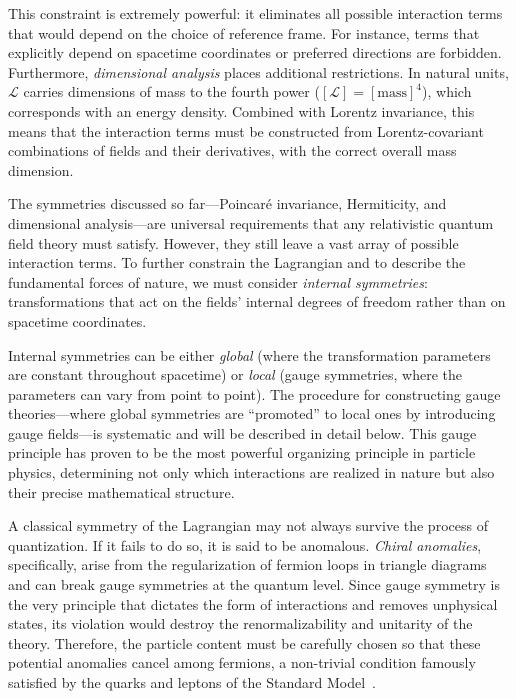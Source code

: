 This constraint is extremely powerful: it eliminates all possible interaction terms that would depend on the choice of reference frame. For instance, terms that explicitly depend on spacetime coordinates or preferred directions are forbidden. Furthermore, \textit{dimensional analysis} places additional restrictions. In natural units, $\mathcal{L}$ carries dimensions of mass to the fourth power ($[\mathcal{L}] = [\text{mass}]^4$), which corresponds with an energy density. Combined with Lorentz invariance, this means that the interaction terms must be constructed from Lorentz-covariant combinations of fields and their derivatives, with the correct overall mass dimension.

The symmetries discussed so far—Poincaré invariance, Hermiticity, and dimensional analysis—are universal requirements that any relativistic quantum field theory must satisfy. However, they still leave a vast array of possible interaction terms. To further constrain the Lagrangian and to describe the fundamental forces of nature, we must consider \textit{internal symmetries}: transformations that act on the fields' internal degrees of freedom rather than on spacetime coordinates.

Internal symmetries can be either \textit{global} (where the transformation parameters are constant throughout spacetime) or \textit{local} (gauge symmetries, where the parameters can vary from point to point). The procedure for constructing gauge theories—where global symmetries are ``promoted'' to local ones by introducing gauge fields—is systematic and will be described in detail below. This gauge principle has proven to be the most powerful organizing principle in particle physics, determining not only which interactions are realized in nature but also their precise mathematical structure.

A classical symmetry of the Lagrangian may not always survive the process of quantization. If it fails to do so, it is said to be anomalous. \textit{Chiral anomalies}, specifically, arise from the regularization of fermion loops in triangle diagrams and can break gauge symmetries at the quantum level. Since gauge symmetry is the very principle that dictates the form of interactions and removes unphysical states, its violation would destroy the renormalizability and unitarity of the theory. Therefore, the particle content must be carefully chosen so that these potential anomalies cancel among fermions, a non-trivial condition famously satisfied by the quarks and leptons of the Standard Model~\parencite{peskin,Weinberg,bertlmann1996anomalies}.

